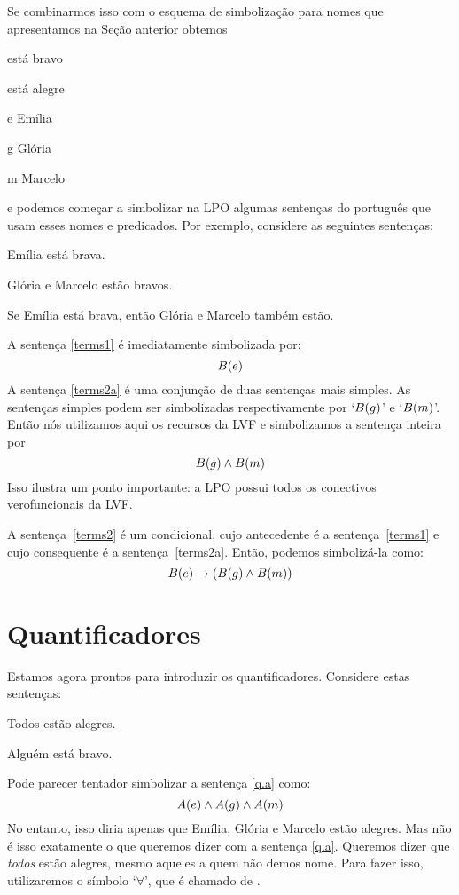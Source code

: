 Se combinarmos isso com o esquema de simbolização para nomes que apresentamos na Seção anterior obtemos
	\begin{ekey}
		\item[\atom{B}{x}]  está bravo
		\item[\atom{A}{x}]  está alegre
		\item[e] Emília
		\item[g] Glória
		\item[m] Marcelo
	\end{ekey}
e podemos começar a simbolizar na LPO algumas sentenças do português que usam esses nomes e predicados.
Por exemplo, considere as seguintes sentenças:
	\begin{earg}
		\item[\ex{terms1}] Emília está brava.
		\item[\ex{terms2a}] Glória e Marcelo estão bravos.
		\item[\ex{terms2}] Se Emília está brava, então Glória e Marcelo também estão.
	\end{earg}

A sentença \ref{terms1} é imediatamente simbolizada por:
$$\mathord{B}(e)$$
A sentença \ref{terms2a} é uma conjunção de duas sentenças mais simples.
As sentenças simples podem ser simbolizadas respectivamente por `$\mathord{B}(g)$' e `$\mathord{B}(m)$'.
Então nós utilizamos aqui os recursos da LVF e simbolizamos a sentença inteira por
$$\mathord{B}(g) \wedge \mathord{B}(m)$$
Isso ilustra um ponto importante:
a LPO possui todos os conectivos verofuncionais da LVF.

A sentença~\ref{terms2} é um condicional, cujo antecedente é a sentença~\ref{terms1} e cujo consequente é a sentença~\ref{terms2a}.
Então, podemos simbolizá-la como:
$$\mathord{B}(e) \rightarrow (\mathord{B}(g) \wedge \mathord{B}(m))$$


\section{Quantificadores}
Estamos agora prontos para introduzir os quantificadores.
Considere estas sentenças:
	\begin{earg}
		\item[\ex{q.a}] Todos estão alegres.
		\item[\ex{q.e}] Alguém está bravo.
	\end{earg}
Pode parecer tentador simbolizar a sentença \ref{q.a} como:
$$\mathord{A}(e) \wedge \mathord{A}(g) \wedge \mathord{A}(m)$$
No entanto, isso diria apenas que Emília, Glória e Marcelo estão alegres.
Mas não é isso exatamente o que queremos dizer com a sentença \ref{q.a}.
Queremos dizer que \emph{todos} estão alegres, mesmo aqueles a quem não demos nome.
Para fazer isso, utilizaremos o símbolo `$\forall$', que é chamado de .

